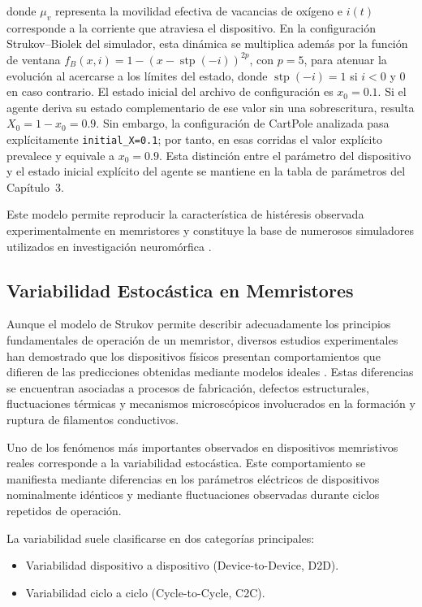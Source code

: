 donde $\mu_v$ representa la movilidad efectiva de vacancias de
oxígeno e $i(t)$ corresponde a la corriente que atraviesa el
dispositivo. En la configuración Strukov--Biolek del simulador, esta
dinámica se multiplica además por la función de ventana
$f_B(x,i)=1-(x-\operatorname{stp}(-i))^{2p}$, con $p=5$, para atenuar
la evolución al acercarse a los límites del estado, donde
$\operatorname{stp}(-i)=1$ si $i<0$ y $0$ en caso contrario. El
estado inicial del archivo de configuración es $x_0=0.1$. Si el agente
deriva su estado complementario de ese valor sin una sobrescritura,
resulta $X_0=1-x_0=0.9$. Sin embargo, la configuración de CartPole
analizada pasa explícitamente \texttt{initial\_X=0.1}; por tanto, en
esas corridas el valor explícito prevalece y equivale a $x_0=0.9$.
Esta distinción entre el parámetro del dispositivo y el estado inicial
explícito del agente se mantiene en la tabla de parámetros del
Capítulo~3.

Este modelo permite reproducir la característica de histéresis observada experimentalmente en memristores y constituye la base de numerosos simuladores utilizados en investigación neuromórfica \cite{26}.

\subsection{Variabilidad Estocástica en Memristores}

Aunque el modelo de Strukov permite describir adecuadamente los principios fundamentales de operación de un memristor, diversos estudios experimentales han demostrado que los dispositivos físicos presentan comportamientos que difieren de las predicciones obtenidas mediante modelos ideales \cite{21,27,29}. Estas diferencias se encuentran asociadas a procesos de fabricación, defectos estructurales, fluctuaciones térmicas y mecanismos microscópicos involucrados en la formación y ruptura de filamentos conductivos.

Uno de los fenómenos más importantes observados en dispositivos memristivos reales corresponde a la variabilidad estocástica. Este comportamiento se manifiesta mediante diferencias en los parámetros eléctricos de dispositivos nominalmente idénticos y mediante fluctuaciones observadas durante ciclos repetidos de operación.

La variabilidad suele clasificarse en dos categorías principales:

\begin{itemize}
\item Variabilidad dispositivo a dispositivo (Device-to-Device, D2D).
\item Variabilidad ciclo a ciclo (Cycle-to-Cycle, C2C).
\end{itemize}

